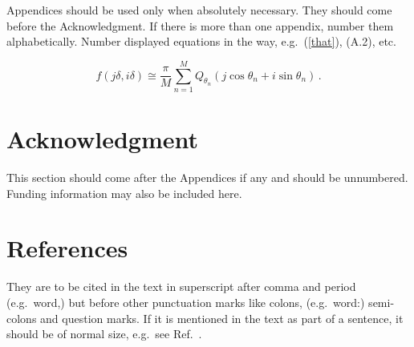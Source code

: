 \documentclass{ws-m3as}
\begin{document}
Appendices should be used only when absolutely necessary. They
should come before the Acknowledgment. If there is more than one
appendix, number them alphabetically. Number displayed equations
in the way, e.g.~(\ref{that}), (A.2), etc.

\noindent
\begin{equation}
f(j\delta, i\delta) \cong \frac{\pi}{M} \sum^M_{n=1}
Q_{\theta_n} (j \cos \theta_n + i \sin \theta_n)\,. \label{that}
\end{equation}

\section*{Acknowledgment}
This section should come after the Appendices if any and should
be unnumbered. Funding information may also be included here.

\section*{References}
They are to be cited in the text in superscript
after comma and period (e.g.~word,\cite{am})
but before other punctuation marks like colons,
(e.g.~word\cite{lar}:) semi-colons and\break
question marks. If it is mentioned in the text as part of a sentence,
it should be of normal size, e.g.~see Ref.~.
\end{document}
